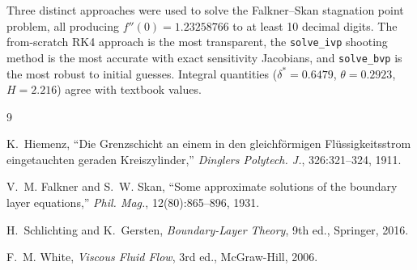 \documentclass[12pt,a4paper]{article}
\begin{document}
Three distinct approaches were used to solve the Falkner--Skan stagnation point problem, all producing $f''(0) = 1.23258766$ to at least 10 decimal digits. The from-scratch RK4 approach is the most transparent, the \texttt{solve\_ivp} shooting method is the most accurate with exact sensitivity Jacobians, and \texttt{solve\_bvp} is the most robust to initial guesses. Integral quantities ($\delta^* = 0.6479$, $\theta = 0.2923$, $H = 2.216$) agree with textbook values.

\begin{thebibliography}{9}

K.~Hiemenz, ``Die Grenzschicht an einem in den gleichförmigen Flüssigkeitsstrom eingetauchten geraden Kreiszylinder,'' \textit{Dinglers Polytech. J.}, 326:321--324, 1911.

V.~M. Falkner and S.~W. Skan, ``Some approximate solutions of the boundary layer equations,'' \textit{Phil. Mag.}, 12(80):865--896, 1931.

H.~Schlichting and K.~Gersten, \textit{Boundary-Layer Theory}, 9th ed., Springer, 2016.

F.~M. White, \textit{Viscous Fluid Flow}, 3rd ed., McGraw-Hill, 2006.

\end{thebibliography}
\end{document}
